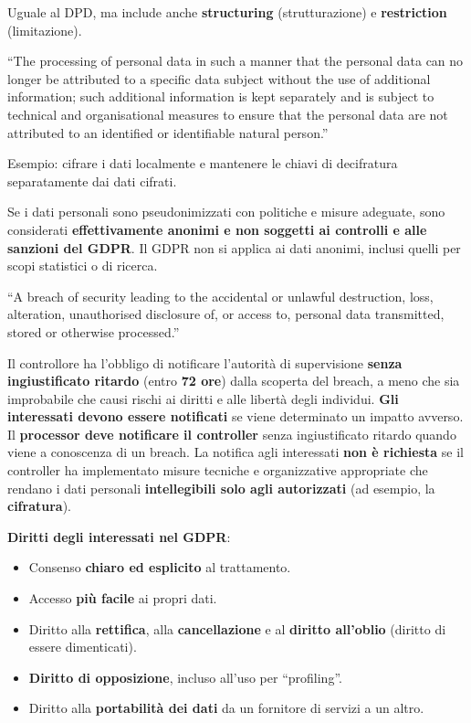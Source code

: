 \documentclass[a4paper,11pt]{article}
\begin{document}
\begin{definizione}
Uguale al DPD, ma include anche \textbf{structuring} (strutturazione) e \textbf{restriction} (limitazione).
\end{definizione}

\begin{definizione}
``The processing of personal data in such a manner that the personal data can no longer be attributed to a specific data subject without the use of additional information; such additional information is kept separately and is subject to technical and organisational measures to ensure that the personal data are not attributed to an identified or identifiable natural person.''

Esempio: cifrare i dati localmente e mantenere le chiavi di decifratura separatamente dai dati cifrati.

Se i dati personali sono pseudonimizzati con politiche e misure adeguate, sono considerati \textbf{effettivamente anonimi e non soggetti ai controlli e alle sanzioni del GDPR}. Il GDPR non si applica ai dati anonimi, inclusi quelli per scopi statistici o di ricerca.
\end{definizione}

\begin{definizione}
``A breach of security leading to the accidental or unlawful destruction, loss, alteration, unauthorised disclosure of, or access to, personal data transmitted, stored or otherwise processed.''

Il controllore ha l'obbligo di notificare l'autorit\`{a} di supervisione \textbf{senza ingiustificato ritardo} (entro \textbf{72 ore}) dalla scoperta del breach, a meno che sia improbabile che causi rischi ai diritti e alle libert\`{a} degli individui. \textbf{Gli interessati devono essere notificati} se viene determinato un impatto avverso. Il \textbf{processor deve notificare il controller} senza ingiustificato ritardo quando viene a conoscenza di un breach. La notifica agli interessati \textbf{non \`{e} richiesta} se il controller ha implementato misure tecniche e organizzative appropriate che rendano i dati personali \textbf{intellegibili solo agli autorizzati} (ad esempio, la \textbf{cifratura}).
\end{definizione}

\textbf{Diritti degli interessati nel GDPR}:
\begin{itemize}
  \item Consenso \textbf{chiaro ed esplicito} al trattamento.
  \item Accesso \textbf{pi\`{u} facile} ai propri dati.
  \item Diritto alla \textbf{rettifica}, alla \textbf{cancellazione} e al \textbf{diritto all'oblio} (diritto di essere dimenticati).
  \item \textbf{Diritto di opposizione}, incluso all'uso per ``profiling''.
  \item Diritto alla \textbf{portabilit\`{a} dei dati} da un fornitore di servizi a un altro.
\end{itemize}
\end{document}
